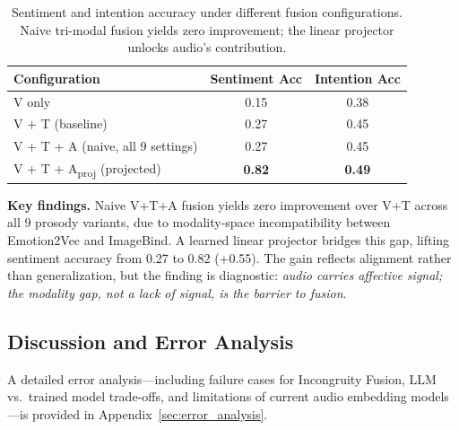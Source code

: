 \begin{table}[h]
\centering
\caption{Sentiment and intention accuracy under different fusion configurations. Naive tri-modal
fusion yields zero improvement; the linear projector unlocks audio's contribution.}
\label{tab:rq2}
\begin{tabular}{lcc}
\toprule
\textbf{Configuration} & \textbf{Sentiment Acc} & \textbf{Intention Acc} \\
\midrule
V only                                     & 0.15 & 0.38 \\
V + T (baseline)                           & 0.27 & 0.45 \\
V + T + A (naive, all 9 settings)          & 0.27 & 0.45 \\
\midrule
V + T + A\textsubscript{proj} (projected)  & \textbf{0.82} & \textbf{0.49} \\
\bottomrule
\end{tabular}
\end{table}

\textbf{Key findings.}
Naive V+T+A fusion yields zero improvement over V+T across all 9 prosody variants, due to
modality-space incompatibility between Emotion2Vec and ImageBind.
A learned linear projector bridges this gap, lifting sentiment accuracy from 0.27 to 0.82 (+0.55).
The gain reflects alignment rather than generalization, but the finding is diagnostic:
\emph{audio carries affective signal; the modality gap, not a lack of signal, is the barrier to fusion}.

\subsection{Discussion and Error Analysis}

A detailed error analysis—including failure cases for Incongruity Fusion, LLM vs.\ trained model
trade-offs, and limitations of current audio embedding models—is provided in
Appendix~\ref{sec:error_analysis}.
